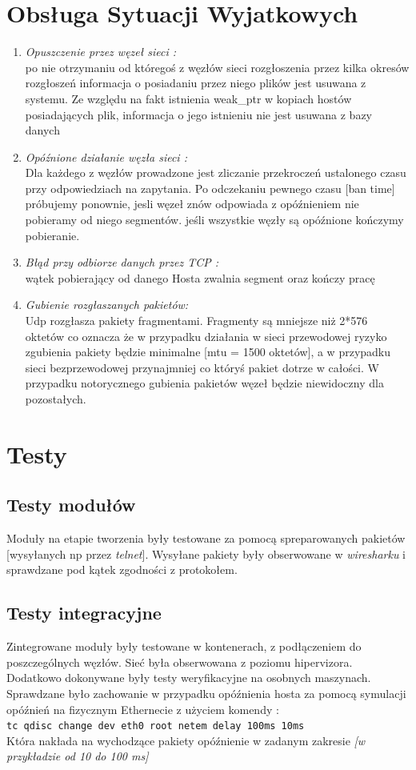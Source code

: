 \documentclass[11pt,oneside]{book}
\newcommand{\+}{\discretionary{\mbox{\scriptsize$\hookleftarrow$}}{}{}}
\begin{document}
\section{Obsługa Sytuacji Wyjatkowych}
\begin{enumerate}
	\item 
	\textit{Opuszczenie przez węzeł sieci :} \\
	po nie otrzymaniu od któregoś z węzłów sieci rozgłoszenia przez kilka okresów rozgłoszeń informacja o posiadaniu przez niego plików jest usuwana z systemu. Ze względu na fakt istnienia weak\_ptr  w kopiach hostów posiadających plik, informacja o jego istnieniu nie jest usuwana z bazy danych
	\item
\textit{	Opóźnione działanie węzła sieci :}\\
	Dla każdego z węzłów prowadzone jest zliczanie przekroczeń ustalonego czasu przy odpowiedziach na zapytania. Po odczekaniu pewnego czasu [ban time] próbujemy ponownie, jesli węzeł znów odpowiada z opóźnieniem nie pobieramy od niego segmentów.
	jeśli wszystkie węzły są opóźnione kończymy pobieranie.
	\item
	\textit{Błąd przy odbiorze danych przez TCP :}\\
	wątek pobierający od danego Hosta zwalnia segment oraz kończy pracę
	\item
\textit{	Gubienie rozgłaszanych pakietów: }\\
	 Udp rozgłasza pakiety fragmentami. Fragmenty są mniejsze niż 2*576 oktetów co oznacza że w przypadku działania w sieci przewodowej ryzyko zgubienia pakiety będzie minimalne [mtu = 1500 oktetów], a w przypadku sieci bezprzewodowej przynajmniej co któryś pakiet dotrze w całości. W przypadku notorycznego gubienia pakietów węzeł będzie niewidoczny dla pozostałych.
	
\end{enumerate}
\section{Testy}
\subsection{Testy modułów}
Moduły na etapie tworzenia były testowane za pomocą spreparowanych pakietów [wysyłanych np przez \textit{telnet}]. Wysyłane pakiety były obserwowane w \textit{wiresharku} i sprawdzane pod kątek zgodności z protokołem.
\subsection{Testy integracyjne}
Zintegrowane moduły były testowane w kontenerach, z podłączeniem do poszczególnych węzłów. Sieć była obserwowana z poziomu hipervizora. Dodatkowo dokonywane były testy weryfikacyjne na osobnych maszynach. Sprawdzane było zachowanie w przypadku opóźnienia hosta za pomocą symulacji opóźnień na fizycznym Ethernecie z użyciem komendy :\\
\texttt{tc qdisc change dev eth0 root netem delay 100ms 10ms} \\
Która nakłada na wychodzące pakiety opóźnienie w zadanym zakresie \textit{[w przykładzie od 10 do 100 ms]}
\end{document}
